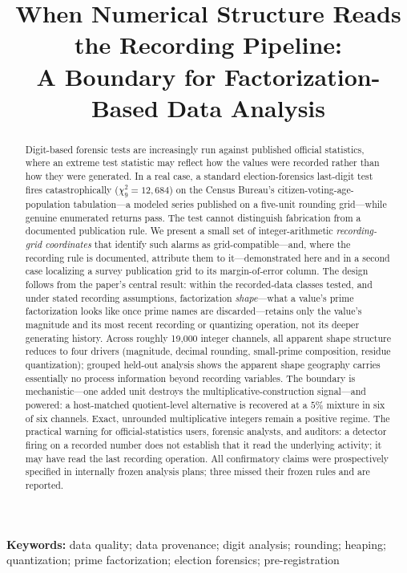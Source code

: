 \documentclass[12pt]{article}
\title{When Numerical Structure Reads the Recording Pipeline:\\
A Boundary for Factorization-Based Data Analysis}
\author{}   %
\date{}
\begin{document}
\maketitle

\begin{abstract}
Digit-based forensic tests are increasingly run against published official
statistics, where an extreme test statistic may reflect how the values were
recorded rather than how they were generated. In a real case, a standard
election-forensics last-digit test fires catastrophically
($\chi^2_9 = 12{,}684$) on the Census Bureau's citizen-voting-age-population
tabulation---a modeled series published on a five-unit rounding grid---while
genuine enumerated returns pass. The test cannot distinguish fabrication
from a documented publication rule. We present a small set of integer-arithmetic \emph{recording-grid
coordinates} that identify such alarms as grid-compatible---and, where the
recording rule is documented, attribute them to it---demonstrated here and in a second
case localizing a survey publication grid to its margin-of-error column. The design follows from the paper's central result:
within the recorded-data classes tested, and under stated recording
assumptions, factorization \emph{shape}---what a value's prime factorization
looks like once prime names are discarded---retains only the value's
magnitude and its most recent recording or quantizing operation, not its deeper
generating history. Across roughly 19{,}000 integer channels, all apparent shape structure
reduces to four drivers (magnitude, decimal rounding, small-prime
composition, residue quantization); grouped held-out analysis shows the
apparent shape geography carries essentially no process information beyond
recording variables. The boundary is mechanistic---one added unit destroys the
multiplicative-construction signal---and powered: a host-matched
quotient-level alternative is recovered at a $5\%$ mixture in six of six
channels. Exact, unrounded
multiplicative integers remain a positive regime. The practical warning for
official-statistics users, forensic analysts, and auditors: a detector firing
on a recorded number does not establish that it read the underlying activity;
it may have read the last recording operation. All confirmatory claims were prospectively specified in internally frozen
analysis plans; three missed their frozen rules and are reported.
\end{abstract}

\medskip
\noindent\textbf{Keywords:} data quality; data provenance; digit analysis;
rounding; heaping; quantization; prime factorization; election forensics;
pre-registration
\end{document}

